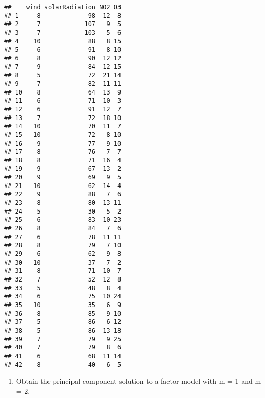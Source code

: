 \documentclass[
]{article}
\newenvironment{Shaded}{\begin{snugshade}}{\end{snugshade}}
\newcommand{\DecValTok}[1]{\textcolor[rgb]{0.00,0.00,0.81}{#1}}
\newcommand{\FunctionTok}[1]{\textcolor[rgb]{0.00,0.00,0.00}{#1}}
\newcommand{\NormalTok}[1]{#1}
\newcommand{\OtherTok}[1]{\textcolor[rgb]{0.56,0.35,0.01}{#1}}
\newcommand{\SpecialCharTok}[1]{\textcolor[rgb]{0.00,0.00,0.00}{#1}}
\newcommand{\StringTok}[1]{\textcolor[rgb]{0.31,0.60,0.02}{#1}}
\providecommand{\tightlist}{%
  \setlength{\itemsep}{0pt}\setlength{\parskip}{0pt}}
\begin{document}
\begin{verbatim}
##    wind solarRadiation NO2 O3
## 1     8             98  12  8
## 2     7            107   9  5
## 3     7            103   5  6
## 4    10             88   8 15
## 5     6             91   8 10
## 6     8             90  12 12
## 7     9             84  12 15
## 8     5             72  21 14
## 9     7             82  11 11
## 10    8             64  13  9
## 11    6             71  10  3
## 12    6             91  12  7
## 13    7             72  18 10
## 14   10             70  11  7
## 15   10             72   8 10
## 16    9             77   9 10
## 17    8             76   7  7
## 18    8             71  16  4
## 19    9             67  13  2
## 20    9             69   9  5
## 21   10             62  14  4
## 22    9             88   7  6
## 23    8             80  13 11
## 24    5             30   5  2
## 25    6             83  10 23
## 26    8             84   7  6
## 27    6             78  11 11
## 28    8             79   7 10
## 29    6             62   9  8
## 30   10             37   7  2
## 31    8             71  10  7
## 32    7             52  12  8
## 33    5             48   8  4
## 34    6             75  10 24
## 35   10             35   6  9
## 36    8             85   9 10
## 37    5             86   6 12
## 38    5             86  13 18
## 39    7             79   9 25
## 40    7             79   8  6
## 41    6             68  11 14
## 42    8             40   6  5
\end{verbatim}

\begin{enumerate}
\def\labelenumi{(\alph{enumi})}
\tightlist
\item
  Obtain the principal component solution to a factor model with m = 1
  and m = 2.
\end{enumerate}

\begin{Shaded}
\end{Shaded}
\end{document}
